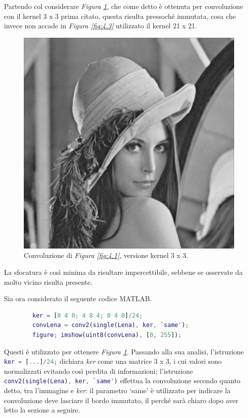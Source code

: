 \documentclass{subfiles}
\begin{document}
Partendo col considerare \emph{Figura \ref{fig:4.2}}, che come detto è ottenuta per convoluzione con il kernel 3 x 3 prima citato,
questa risulta pressoché immutata, cosa che invece non accade in \emph{Figura \ref{fig:4.3}} utilizzato il kernel 21 x 21.
\begin{figure}
    \centering
    \includegraphics[scale = 0.325]{../Images/Lena/MeanConvolutionLena.png}
    \caption{Convoluzione di \emph{Figura \ref{fig:4.1}}, versione kernel 3 x 3.}
    \label{fig:4.2}
\end{figure}
La sfocatura è così minima da risultare impercettibile, sebbene se osservate da molto vicino risulta presente.

Sia ora considerato il seguente codice MATLAB.
\begin{center}
    \begin{lstlisting}[language = MATLAB]
        % caricamento dell'immagine Lena
        ker = [0 4 0; 4 8 4; 0 4 0]/24;
        convLena = conv2(single(Lena), ker, `same');
        figure; imshow(uint8(convLena), [0, 255]);
    \end{lstlisting}
\end{center}
Questi è utilizzato per ottenere \emph{Figura \ref{fig:4.2}}. Passando alla sua analisi, l'istruzione \lstinline[language = MATLAB]{ker = [...]/24;}
dichiara \emph{ker} come una matrice 3 x 3, i cui valori sono normalizzati evitando così perdita di informazioni;
l'istruzione \lstinline[language = MATLAB]{conv2(single(Lena), ker, `same')} effettua la convoluzione secondo quanto detto, tra l'immagine e \emph{ker}:
il parametro `same' è utilizzato per indicare la convoluzione deve lasciare il bordo immutato, il perché sarà chiaro dopo aver letto la sezione a seguire.
\end{document}
